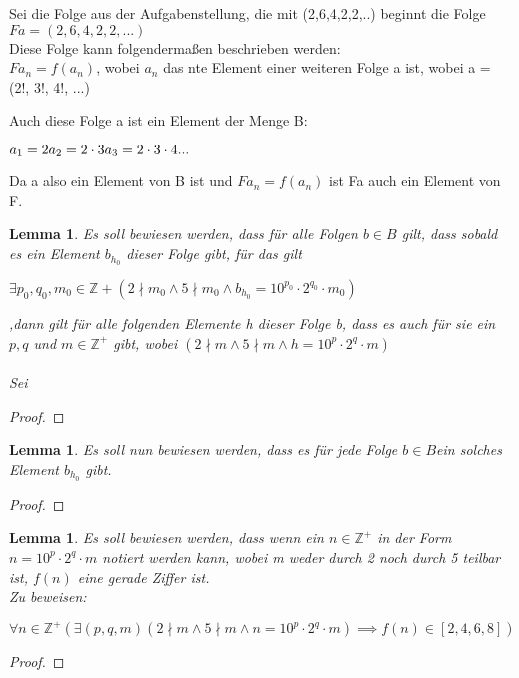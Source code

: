 \documentclass[12pt, letterpaper]{article}
\newtheorem{lemma}[theorem]{Lemma}
\begin{document}
Sei die Folge aus der Aufgabenstellung, die mit (2,6,4,2,2,..) beginnt die Folge $Fa = (2,6,4,2,2,...)$
\\Diese Folge kann folgendermaßen beschrieben werden:\\
$Fa_{n} = f(a_{n})$, wobei $a_{n}$ das nte Element einer weiteren Folge a ist, wobei a = (2!, 3!, 4!, ...)




Auch diese Folge a ist ein Element der Menge B:
\begin{center}
  \begin{math}
    a_{1}=2\\
    a_{2} = 2\cdot 3\\
    a_{3} = 2\cdot 3\cdot 4\\
    ...
  \end{math}
\end{center}
Da a also ein Element von B ist und $Fa_{n} = f(a_{n})$ ist Fa auch ein Element von F.


\begin{lemma}
  Es soll bewiesen werden, dass für alle Folgen $b\in B$ gilt, dass sobald es ein Element $b_{h_{0}}$ dieser Folge gibt, für das gilt \begin{center}
  $\exists p_{0},q_{0},m_{0}\in \mathbb{Z+}(2\nmid m_{0}\land 5\nmid m_{0} \land b_{h_{0}} = 10^{p_{0}}\cdot 2^{q_{0}}\cdot m_{0} )$
\end{center} 
,dann gilt für alle folgenden Elemente h dieser Folge b, dass es auch für sie ein $p, q$ und $m \in \mathbb{Z^{+}}$ gibt, wobei $(2\nmid m \land  5\nmid m \land h = 10^{p}\cdot 2^{q}\cdot m)$
\\\\
Sei

\end{lemma}
\begin{proof}
  
\end{proof}
\begin{lemma}
 Es soll nun bewiesen werden, dass es für jede Folge $b\in B$ein solches Element $b_{h_{0}}$ gibt. 
\end{lemma}
\begin{proof}
  
\end{proof}
\begin{lemma}
  Es soll bewiesen werden, dass wenn ein $n\in \mathbb{Z^{+}}$ in der Form $n= 10^{p}\cdot 2^{q}\cdot m$ notiert werden kann, wobei m weder durch 2 noch durch 5 teilbar ist, $f(n)$ eine gerade Ziffer ist.\\

  Zu beweisen:
\begin{center}
\begin{math}
  \forall n\in\mathbb{Z^{+}}(\exists(p,q,m)(2\nmid m\land 5\nmid m \land n = 10^{p}\cdot 2^{q}\cdot m)\implies f(n)\in [2,4,6,8])
\end{math} 
\end{center}
\end{lemma}
\begin{proof}
  
\end{proof}
\end{document}
